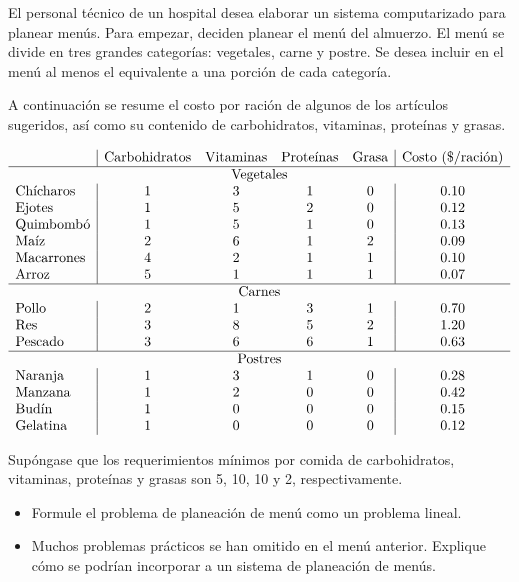 \begin{Ejer} El personal t\'ecnico de un hospital desea elaborar un sistema computarizado para planear men\'us. Para empezar, deciden planear el men\'u del almuerzo. El men\'u se divide en tres grandes categor\'ias: vegetales, carne y postre. Se desea incluir en el men\'u al menos el equivalente a una porci\'on de cada categor\'ia.

A continuaci\'on se resume el costo por raci\'on de algunos de los art\'iculos sugeridos, as\'i como su contenido de carbohidratos, vitaminas, prote\'inas y grasas.

\[
\begin{array}{l|cccc|c}
 & \text{Carbohidratos} & \text{Vitaminas} & \text{Prote\'inas} & \text{Grasa} & \text{Costo (\$/raci\'on)} \\
\hline
\multicolumn{6}{c}{\text{Vegetales}} \\
\text{Ch\'icharos} & 1 & 3 & 1 & 0 & 0.10 \\
\text{Ejotes} & 1 & 5 & 2 & 0 & 0.12 \\
\text{Quimbomb\'o} & 1 & 5 & 1 & 0 & 0.13 \\
\text{Ma\'iz} & 2 & 6 & 1 & 2 & 0.09 \\
\text{Macarrones} & 4 & 2 & 1 & 1 & 0.10 \\
\text{Arroz} & 5 & 1 & 1 & 1 & 0.07 \\
\hline
\multicolumn{6}{c}{\text{Carnes}} \\
\text{Pollo} & 2 & 1 & 3 & 1 & 0.70 \\
\text{Res} & 3 & 8 & 5 & 2 & 1.20 \\
\text{Pescado} & 3 & 6 & 6 & 1 & 0.63 \\
\hline
\multicolumn{6}{c}{\text{Postres}} \\
\text{Naranja} & 1 & 3 & 1 & 0 & 0.28 \\
\text{Manzana} & 1 & 2 & 0 & 0 & 0.42 \\
\text{Bud\'in} & 1 & 0 & 0 & 0 & 0.15 \\
\text{Gelatina} & 1 & 0 & 0 & 0 & 0.12
\end{array}
\]

Sup\'ongase que los requerimientos m\'inimos por comida de carbohidratos, vitaminas, prote\'inas y grasas son 5, 10, 10 y 2, respectivamente.

\begin{itemize}
\item[(a)] Formule el problema de planeaci\'on de men\'u como un problema lineal.
\item[(b)] Muchos problemas pr\'acticos se han omitido en el men\'u anterior. Explique c\'omo se podr\'ian incorporar a un sistema de planeaci\'on de men\'us.
\end{itemize}
\end{Ejer}

